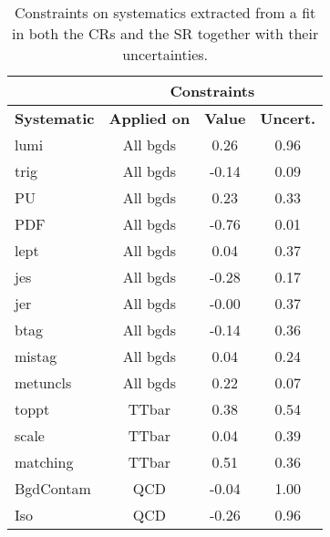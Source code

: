 \documentclass[10pt]{article}
\begin{document}
\begin{table}[!ht]
\begin{center}
\begin{tabular}{|l|c|c|c|}
\hline
\hline
& \multicolumn{3}{c|}{\textbf{Constraints}} \\
\hline
\hline
\textbf{Systematic} & \textbf{Applied on} & \textbf{Value} & \textbf{Uncert.}\\
\hline
lumi            & All bgds  &  0.26   & 0.96   \\
trig            & All bgds  & -0.14   & 0.09   \\
PU              & All bgds  &  0.23   & 0.33   \\
PDF             & All bgds  & -0.76   & 0.01   \\
lept            & All bgds  &  0.04   & 0.37   \\
jes             & All bgds  & -0.28   & 0.17   \\
jer             & All bgds  & -0.00   & 0.37   \\
btag            & All bgds  & -0.14   & 0.36   \\
mistag          & All bgds  &  0.04   & 0.24   \\
metuncls        & All bgds  &  0.22   & 0.07   \\
toppt           & TTbar     &  0.38   & 0.54   \\
scale           & TTbar     &  0.04   & 0.39   \\
matching        & TTbar     &  0.51   & 0.36   \\
BgdContam       & QCD       & -0.04   & 1.00   \\
Iso             & QCD       & -0.26   & 0.96   \\
\hline
\hline

\hline
\hline
\end{tabular}
\caption{Constraints on systematics extracted from a fit in both the CRs and the SR together with their uncertainties.}
\label{tab:SFtable}
\end{center}
\end{table} 
\end{document}

